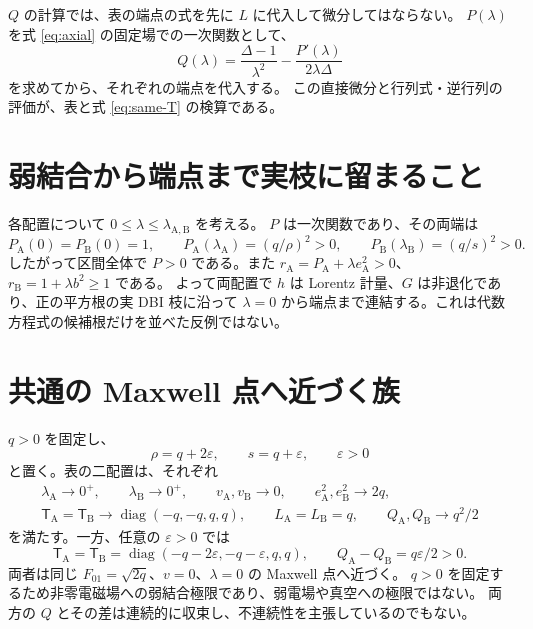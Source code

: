 \documentclass[11pt,a4paper]{article}
\newcommand{\diag}{\operatorname{diag}}
\newcommand{\Tmix}{\mathsf T}
\begin{document}
$Q$ の計算では、表の端点の式を先に $L$ に代入して微分してはならない。
$P(\lambda)$ を式 \eqref{eq:axial} の固定場での一次関数として、
\begin{equation}\label{eq:Q-direct}
Q(\lambda)=\frac{\Delta-1}{\lambda^2}
-\frac{P'(\lambda)}{2\lambda\Delta}
\end{equation}
を求めてから、それぞれの端点を代入する。
この直接微分と行列式・逆行列の評価が、表と式 \eqref{eq:same-T} の検算である。

\section{弱結合から端点まで実枝に留まること}
各配置について $0\leq\lambda\leq\lambda_{\mathrm A,\mathrm B}$ を考える。
$P$ は一次関数であり、その両端は
\begin{equation}\label{eq:positive}
P_{\mathrm A}(0)=P_{\mathrm B}(0)=1,\qquad
P_{\mathrm A}(\lambda_{\mathrm A})=(q/\rho)^2>0,\qquad
P_{\mathrm B}(\lambda_{\mathrm B})=(q/s)^2>0 .
\end{equation}
したがって区間全体で $P>0$ である。また
$r_{\mathrm A}=P_{\mathrm A}+\lambda e_{\mathrm A}^2>0$、
$r_{\mathrm B}=1+\lambda b^2\geq1$ である。
よって両配置で $h$ は Lorentz 計量、$G$ は非退化であり、正の平方根の実 DBI 枝に沿って
$\lambda=0$ から端点まで連結する。これは代数方程式の候補根だけを並べた反例ではない。

\newpage
\section{共通の Maxwell 点へ近づく族}
$q>0$ を固定し、
\begin{equation}\label{eq:eps}
\rho=q+2\varepsilon,\qquad s=q+\varepsilon,\qquad\varepsilon>0
\end{equation}
と置く。表の二配置は、それぞれ
\begin{equation}\label{eq:weak}
\begin{gathered}
\lambda_{\mathrm A}\longrightarrow0^+,\qquad
\lambda_{\mathrm B}\longrightarrow0^+,\qquad
v_{\mathrm A},v_{\mathrm B}\longrightarrow0,\qquad
 e_{\mathrm A}^2,e_{\mathrm B}^2\longrightarrow2q,\\
\Tmix_{\mathrm A}=\Tmix_{\mathrm B}\longrightarrow\diag(-q,-q,q,q),\qquad
L_{\mathrm A}=L_{\mathrm B}=q,\qquad
Q_{\mathrm A},Q_{\mathrm B}\longrightarrow q^2/2
\end{gathered}
\end{equation}
を満たす。一方、任意の $\varepsilon>0$ では
\begin{equation}\label{eq:weak-gap}
\Tmix_{\mathrm A}=\Tmix_{\mathrm B}=\diag(-q-2\varepsilon,-q-\varepsilon,q,q),
\qquad Q_{\mathrm A}-Q_{\mathrm B}=q\varepsilon/2>0 .
\end{equation}
両者は同じ $F_{01}=\sqrt{2q}$、$v=0$、$\lambda=0$ の Maxwell 点へ近づく。
$q>0$ を固定するため非零電磁場への弱結合極限であり、弱電場や真空への極限ではない。
両方の $Q$ とその差は連続的に収束し、不連続性を主張しているのでもない。
\end{document}
